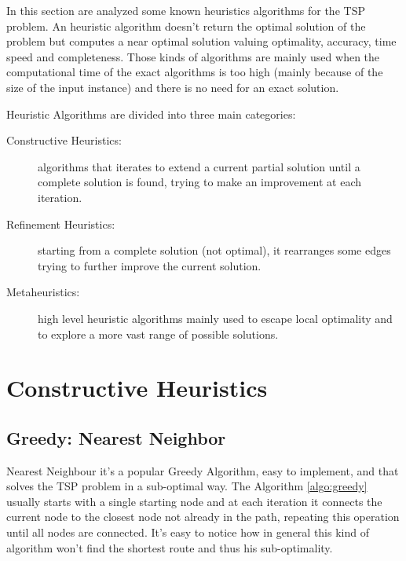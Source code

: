 In this section are analyzed some known heuristics algorithms for the TSP problem. An heuristic algorithm doesn’t return the optimal solution of the problem but computes a near optimal solution valuing optimality, accuracy, time speed and completeness. Those kinds of algorithms are mainly used when the computational time of the exact algorithms is too high (mainly because of the size of the input instance) and there is no need for an exact solution.

Heuristic Algorithms are divided into three main categories:
\begin{description}
    \item[Constructive Heuristics:] algorithms that iterates to extend a current partial solution until a complete solution is found, trying to make an improvement at each iteration.
    \item[Refinement Heuristics:] starting from a complete solution (not optimal), it rearranges some edges trying to further improve the current solution.
    \item[Metaheuristics:] high level heuristic algorithms mainly used to escape local optimality and to explore a more vast range of possible solutions.
\end{description}

\section{Constructive Heuristics}
\subsection{Greedy: Nearest Neighbor}
Nearest Neighbour it’s a popular Greedy Algorithm, easy to implement, and that solves the TSP problem in a sub-optimal way. The Algorithm \ref{algo:greedy} usually starts with a single starting node and at each iteration it connects the current node to the closest node not already in the path, repeating this operation until all nodes are connected. It’s easy to notice how in general this kind of algorithm won’t find the shortest route and thus his sub-optimality.


